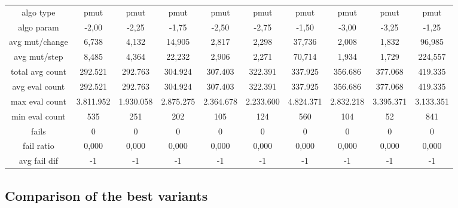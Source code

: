 \begin{tabular}[h]{cccccccccc}
algo type&                pmut&         pmut&         pmut&         pmut&         pmut&         pmut&         pmut&         pmut&         pmut\\
algo param&              -2,00&        -2,25&        -1,75&        -2,50&        -2,75&        -1,50&        -3,00&        -3,25&        -1,25\\
avg mut/change&          6,738&        4,132&       14,905&        2,817&        2,298&       37,736&        2,008&        1,832&       96,985\\
avg mut/step&            8,485&        4,364&       22,232&        2,906&        2,271&       70,714&        1,934&        1,729&      224,557\\
\hline
total avg count&       292.521&      292.763&      304.924&      307.403&      322.391&      337.925&      356.686&      377.068&      419.335\\
avg eval count&        292.521&      292.763&      304.924&      307.403&      322.391&      337.925&      356.686&      377.068&      419.335\\
max eval count&      3.811.952&    1.930.058&    2.875.275&    2.364.678&    2.233.600&    4.824.371&    2.832.218&    3.395.371&    3.133.351\\
min eval count&            535&          251&          202&          105&          124&          560&          104&           52&          841\\
\hline
fails&                       0&            0&            0&            0&            0&            0&            0&            0&            0\\
fail ratio&              0,000&        0,000&        0,000&        0,000&        0,000&        0,000&        0,000&        0,000&        0,000\\
avg fail dif&               -1&           -1&           -1&           -1&           -1&           -1&           -1&           -1&           -1\\
\end{tabular}


\subsection{Comparison of the best variants}



